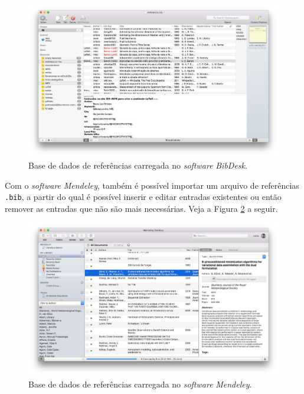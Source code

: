 \begin{figure}[H]
\caption{Base de dados de referências carregada no \textit{software} \textit{BibDesk}.}
\vspace{6mm}
    \begin{center}
        \includegraphics[scale=0.3]{./docs/figs/bibdesk.pdf}
    \end{center}
\vspace{4mm}
\label{fig:exe_bibdesk}
\end{figure}

Com o \textit{software} \textit{Mendeley}, também é possível importar um arquivo de referências {\tt .bib}, a partir do qual é possível inserir e editar entradas existentes ou então remover as entradas que não são mais necessárias. Veja a Figura \ref{fig:exe_mendeley} a seguir.
 
\begin{figure}[H]
\caption{Base de dados de referências carregada no \textit{software} \textit{Mendeley}.}
\vspace{6mm}
    \begin{center}
        \includegraphics[scale=0.3]{./docs/figs/mendeley.pdf}
    \end{center}
\vspace{4mm}
\label{fig:exe_mendeley}
\end{figure}

